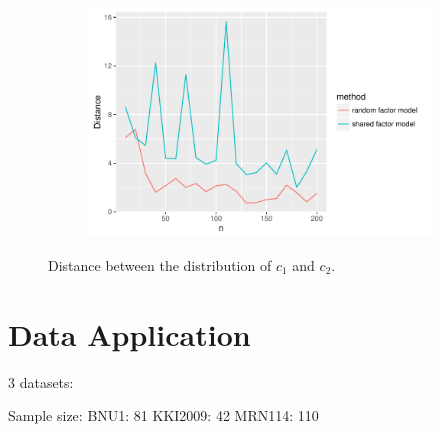 \documentclass[12pt]{article}
\newcommand{\bfi}{\begin{figure}[H]}
\newcommand{\efi}{\end{figure}}
\newcommand{\bsfi}{\begin{subfigure}[t]}
\newcommand{\esfi}{\end{subfigure}}
\begin{document}
\bfi
\centering
\bsfi{0.8\columnwidth}
\includegraphics[width=1\columnwidth]{../BatchEffectRemoval/dist_N}
\esfi
\caption{Distance between the distribution of $c_{1}$ and $c_{2}$.}
\efi



\section{Data Application}

3 datasets:

Sample size:
BNU1: 81
KKI2009: 42
MRN114: 110
\end{document}
